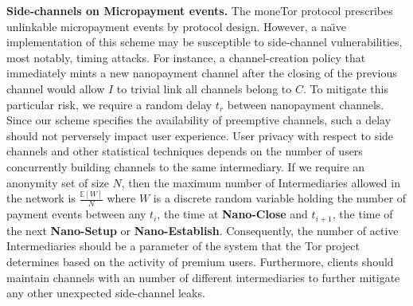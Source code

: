 
\medskip
\noindent\textbf{Side-channels on Micropayment events.}
The moneTor protocol prescribes unlinkable micropayment events by protocol
design. However, a na\"{\i}ve implementation of this scheme may be susceptible to
side-channel vulnerabilities, most notably, timing attacks. For instance, a
channel-creation policy that immediately mints a new nanopayment channel after
the closing of the previous channel would allow $I$ to trivial link all channels
belong to $C$. To mitigate this particular risk, we require a random delay $t_r$
between nanopayment channels. Since our scheme specifies the availability of
preemptive channels, such a delay should not perversely impact user experience.
User privacy with respect to side channels and other statistical techniques
depends on the number of users concurrently building channels to the same
intermediary. If we require an anonymity set of size $N$, then the maximum
number of Intermediaries allowed in the network is $\frac{\mathbb{E}[W]}{N}$
where $W$ is a discrete random variable holding the number of payment events
between any $t_i$, the time at \textbf{Nano-Close} and $t_{i+1}$, the time of
the next \textbf{Nano-Setup} or \textbf{Nano-Establish}. Consequently, the
number of active Intermediaries should be a parameter of the system that the Tor
project determines based on the activity of premium users. Furthermore, clients
should maintain channels with an number of different intermediaries to further
mitigate any other unexpected side-channel leaks.



